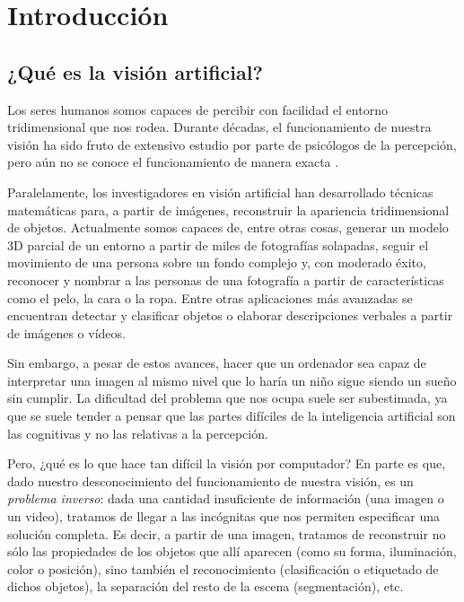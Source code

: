 \section{Introducción}
\subsection{¿Qué es la visión artificial?}

Los seres humanos somos capaces de percibir con facilidad el entorno tridimensional que nos rodea. Durante décadas, el funcionamiento de nuestra visión ha sido fruto de extensivo estudio por parte de psicólogos de la percepción, pero aún no se conoce el funcionamiento de manera exacta  \cite{book:szeliski}.

Paralelamente, los investigadores en visión artificial han desarrollado técnicas matemáticas para, a partir de imágenes, reconstruir la apariencia tridimensional de objetos. Actualmente somos capaces de, entre otras cosas, generar un modelo 3D parcial de un entorno a partir de miles de fotografías solapadas, seguir el movimiento de una persona sobre un fondo complejo y, con moderado éxito, reconocer y nombrar a las personas de una fotografía a partir de características como el pelo, la cara o la ropa. Entre otras aplicaciones más avanzadas se encuentran detectar y clasificar objetos o elaborar descripciones verbales a partir de imágenes o vídeos.

Sin embargo, a pesar de estos avances, hacer que un ordenador sea capaz de interpretar una imagen al mismo nivel que lo haría un niño sigue siendo un sueño sin cumplir. La dificultad del problema que nos ocupa suele ser subestimada, ya que se suele tender a pensar que las partes difíciles de la inteligencia artificial son las cognitivas y no las relativas a la percepción. 

Pero, ¿qué es lo que hace tan difícil la visión por computador? En parte es que, dado nuestro desconocimiento del funcionamiento de nuestra visión, es un \textit{problema inverso}: dada una cantidad insuficiente de información (una imagen o un video), tratamos de llegar a las incógnitas que nos permiten especificar una solución completa. Es decir, a partir de una imagen, tratamos de reconstruir no sólo las propiedades de los objetos que allí aparecen (como su forma, iluminación, color o posición), sino también el reconocimiento (clasificación o etiquetado de dichos objetos), la separación del resto de la escena (segmentación), etc.

